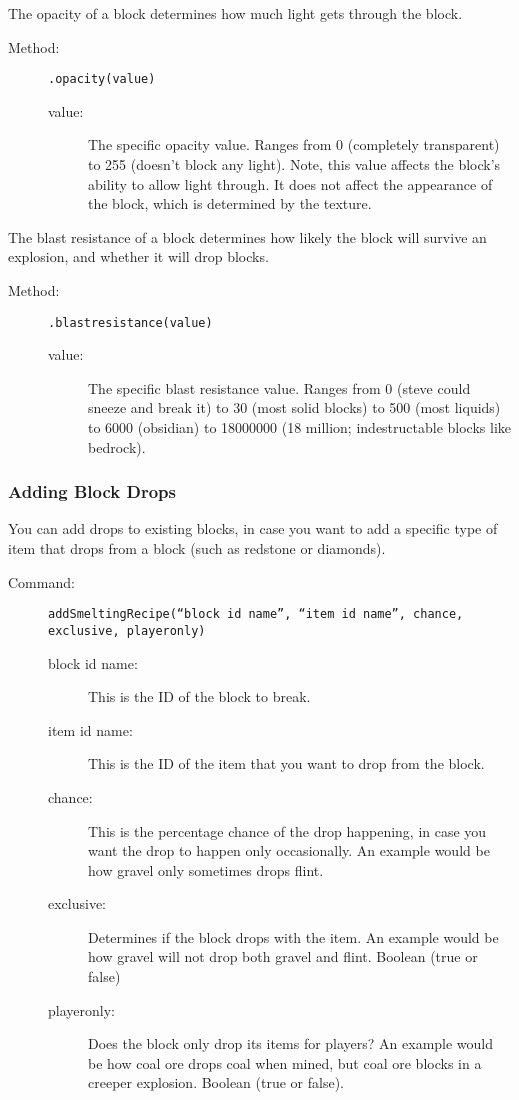 \documentclass[letterpaper,titlepage,12pt]{article}
\begin{document}
The opacity of a block determines how much light gets through the block.

\begin{description}
\item[Method:] \texttt{.opacity(value)}
\begin{description}
\item [value:] The specific opacity value.  Ranges from 0 (completely transparent) to 255 (doesn't block any light).  Note, this value affects the block's ability to allow light through.  It does not affect the appearance of the block, which is determined by the texture.
\end{description}
\end{description}

The blast resistance of a block determines how likely the block will survive an explosion, and whether it will drop blocks.

\begin{description}
\item[Method:] \texttt{.blastresistance(value)}
\begin{description}
\item [value:] The specific blast resistance value.  Ranges from 0 (steve could sneeze and break it) to 30 (most solid blocks) to 500 (most liquids) to 6000 (obsidian) to 18000000 (18 million; indestructable blocks like bedrock).
\end{description}
\end{description}

\subsubsection{Adding Block Drops}

You can add drops to existing blocks, in case you want to add a specific type of item that drops from a block (such as redstone or diamonds).

\begin{description}
\item[Command:] \texttt{addSmeltingRecipe(``block id name'', ``item id name'', chance, exclusive, playeronly)}
\begin{description}
\item [block id name:] This is the ID of the block to break.
\item [item id name:] This is the ID of the item that you want to drop from the block.
\item [chance:] This is the percentage chance of the drop happening, in case you want the drop to happen only occasionally.  An example would be how gravel only sometimes drops flint.
\item [exclusive:] Determines if the block drops with the item.  An example would be how gravel will not drop both gravel and flint. Boolean (true or false)
\item [playeronly:] Does the block only drop its items for players?  An example would be how coal ore drops coal when mined, but coal ore blocks in a creeper explosion.  Boolean (true or false).
\end{description}
\end{description}
\end{document}
